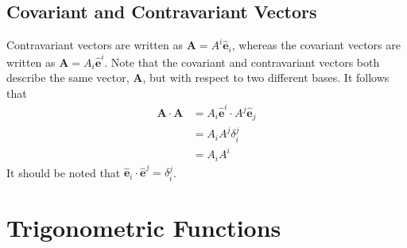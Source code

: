 \documentclass[oneside]{book}
\numberwithin{figure}{section}
\numberwithin{equation}{section}
\newcommand{\bhat}[1]{\bm{\hat{#1}}}
\theoremstyle{definition}
\begin{document}
	\section{Covariant and Contravariant Vectors}
	Contravariant vectors are written as $ \bm{A} = A^{i}\bhat{e}_i $, whereas the covariant vectors are written as $ \bm{A} = A_i\bhat{e}^i $. Note that the covariant and contravariant vectors both describe the same vector, $ \bm{A} $, but with respect to two different bases. It follows that
	\begin{align}
		\bm{A} \cdot \bm{A} &= A_i\bhat{e}^i \cdot A^j\bhat{e}_j\\
		&= A_iA^j\delta_i^j\\
		&= A_iA^i
	\end{align}
	It should be noted that $ \bhat{e}_i \cdot \bhat{e}^j = \delta_i^j $.

	\chapter{Trigonometric Functions}
\end{document}
